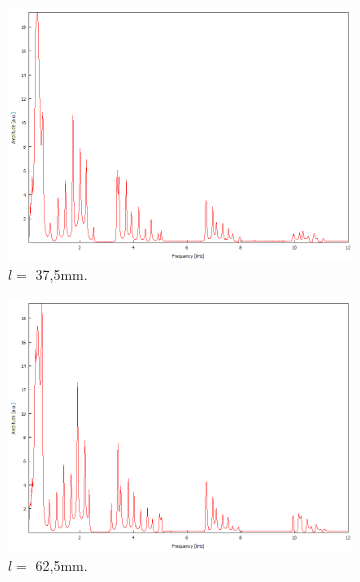 \begin{figure}
    \centering
    \begin{subfigure}[b]{0.3\textwidth}
        \centering
        \includegraphics[width=\textwidth]{data/4_3/375.png}
        \caption{$l =$ 37,5\;mm.}
    \end{subfigure}
    \hfill
    \begin{subfigure}[b]{0.3\textwidth}
        \centering
        \includegraphics[width=\textwidth]{data/4_3/625mm.png}
        \caption{$l =$ 62,5\;mm.}
    \end{subfigure}
    \hfill
    \begin{subfigure}[b]{0.3\textwidth}
        \centering

\end{subfigure}
\end{figure}
